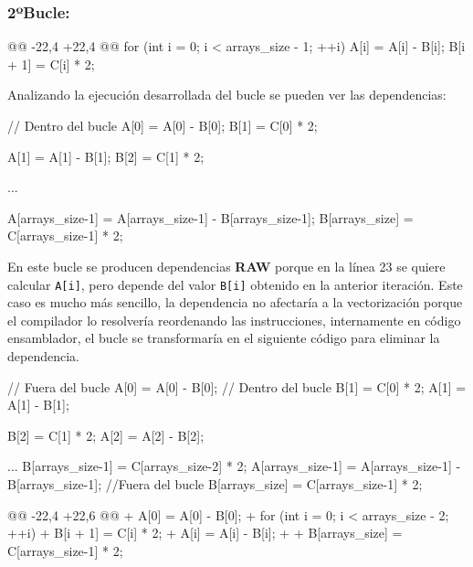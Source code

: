 \subsubsection{\textbf{2ºBucle:}}
\begin{listing}[firstnumber=21]
    @@ -22,4 +22,4 @@
    for (int i = 0; i < arrays_size - 1; ++i) {
      A[i] = A[i] - B[i];
      B[i + 1] = C[i] * 2;
    }
\end{listing}
\par Analizando la ejecución desarrollada del bucle se pueden ver las dependencias:
\begin{listing}[numbers=none]
    // Dentro del bucle
    A[0] = A[0] - B[0];
    B[1] = C[0] * 2;

    A[1] = A[1] - B[1];
    B[2] = C[1] * 2;

            ...

    A[arrays_size-1] = A[arrays_size-1] - B[arrays_size-1];
    B[arrays_size] = C[arrays_size-1] * 2; 
\end{listing}
\par En este bucle se producen dependencias \textbf{RAW} porque en la línea 23 se quiere calcular \texttt{A[i]}, pero depende del valor \texttt{B[i]} obtenido
en la anterior iteración. Este caso es mucho más sencillo, la dependencia no afectaría a la vectorización porque el compilador lo
resolvería reordenando las instrucciones, internamente en código ensamblador, el bucle se transformaría en el siguiente código
para eliminar la dependencia.
\begin{listing}[numbers=none]
    // Fuera del bucle
    A[0] = A[0] - B[0];
    // Dentro del bucle
    B[1] = C[0] * 2;
    A[1] = A[1] - B[1];

    B[2] = C[1] * 2;
    A[2] = A[2] - B[2];

            ...
    B[arrays_size-1] = C[arrays_size-2] * 2;
    A[arrays_size-1] = A[arrays_size-1] - B[arrays_size-1];
    //Fuera del bucle
    B[arrays_size] = C[arrays_size-1] * 2; 
\end{listing}
\begin{listing}[firstnumber=21]
    @@ -22,4 +22,6 @@
  + A[0] = A[0] - B[0];
  + for (int i = 0; i < arrays_size - 2; ++i) {
  +    B[i + 1] = C[i] * 2;
  +    A[i] = A[i] - B[i];
  + }
  + B[arrays_size] = C[arrays_size-1] * 2;
\end{listing}